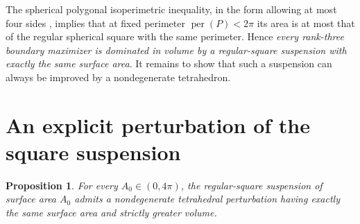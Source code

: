 \documentclass[11pt,reqno]{amsart}
\newtheorem{proposition}[theorem]{Proposition}
\theoremstyle{remark}
\begin{document}
The spherical polygonal isoperimetric inequality, in the form allowing at most four sides \cite{DattaGupta}, implies that at fixed perimeter $\operatorname{per}(P)<2\pi$ its area is at most that of the regular spherical square with the same perimeter. Hence \emph{every rank-three boundary maximizer is dominated in volume by a regular-square suspension with exactly the same surface area}. It remains to show that such a suspension can always be improved by a nondegenerate tetrahedron.

\section{An explicit perturbation of the square suspension}\label{sec:perturb}

\begin{proposition}\label{prop:boundary}
For every $A_0\in(0,4\pi)$, the regular-square suspension of surface area $A_0$ admits a nondegenerate tetrahedral perturbation having exactly the same surface area and strictly greater volume.
\end{proposition}
\end{document}
